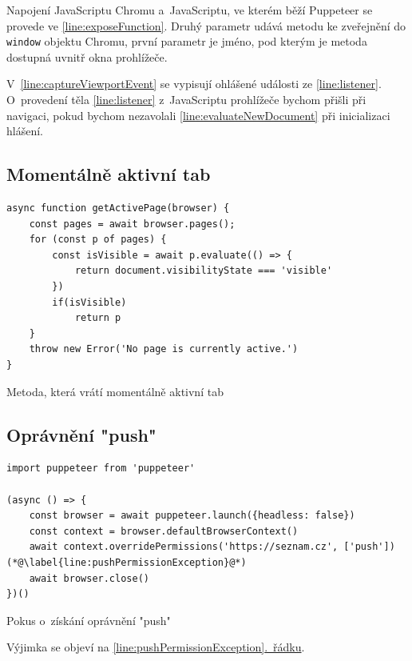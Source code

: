 \documentclass[12pt, a4paper, twoside]{article}
\newcommand{\codefigureSpacing}{1.2}
\newcommand{\refAddedText}[3]{\hyperref[#1]{#2\ref{#1}#3}}
\newcommand{\lineref}[2]{\refAddedText{#1}{}{.~#2}}
\begin{document}
	Napojení JavaScriptu Chromu a~JavaScriptu, ve kterém běží Puppeteer se provede ve \ref{line:exposeFunction}. Druhý parametr udává metodu ke zveřejnění do \texttt{window} objektu Chromu, první parametr je jméno, pod kterým je metoda dostupná uvnitř okna prohlížeče.
	
	V~\ref{line:captureViewportEvent} se vypisují ohlášené události ze \ref{line:listener}. O~provedení těla \ref{line:listener} z~JavaScriptu prohlížeče bychom přišli při navigaci, pokud bychom nezavolali \ref{line:evaluateNewDocument} při inicializaci hlášení.
	\subsection{Momentálně aktivní tab}
	\label{sub_sec:getActivePage}
	\begin{codefigure}[H]
		\renewcommand\baselinestretch{\codefigureSpacing}
		\begin{lstlisting}[style=MyJavaScript]
async function getActivePage(browser) {
	const pages = await browser.pages();
	for (const p of pages) {
		const isVisible = await p.evaluate(() => { 
			return document.visibilityState === 'visible' 
		})
		if(isVisible)
			return p
	}
	throw new Error('No page is currently active.')
}
		\end{lstlisting}
		\caption{Metoda, která vrátí momentálně aktivní tab}
	\end{codefigure}
	\subsection{Oprávnění "push"}
	\label{sub_sec:pushException}
	\begin{codefigure}[H]
		\renewcommand\baselinestretch{\codefigureSpacing}
		\begin{lstlisting}[style=MyJavaScript]
import puppeteer from 'puppeteer'

(async () => {
	const browser = await puppeteer.launch({headless: false})
	const context = browser.defaultBrowserContext()
	await context.overridePermissions('https://seznam.cz', ['push'])(*@\label{line:pushPermissionException}@*)
	await browser.close()
})()
		\end{lstlisting}
		\caption{Pokus o~získání oprávnění "push"}
	\end{codefigure}
	\noindent Výjimka se objeví na \lineref{line:pushPermissionException}{řádku}.
\end{document}

